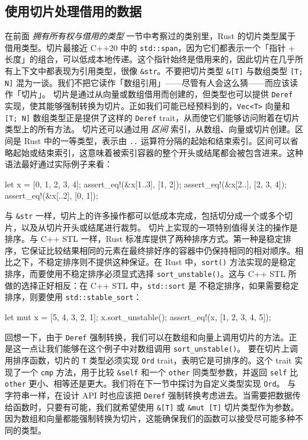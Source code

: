 \subsection{使用切片处理借用的数据}
\label{idx:idx_71c78df5}
在前面 \emph{拥有所有权与借用的类型} 一节中考察过的类别里，Rust 的切片类型属于借用类型。切片最接近 C++20 中的 \texttt{std::span}，因为它们都表示一个「指针 + 长度」的组合，可以低成本地传递。这个指针始终是借用来的，因此切片在几乎所有上下文中都表现为引用类型，很像 \texttt{\&str}。不要把切片类型 \texttt{\&[T]} 与数组类型 \texttt{[T; N]} 混为一谈。我们不把它读作「数组引用」——尽管有人会这么猜——而应该读作「切片」。
切片是通过从向量或数组借用而创建的，但类型也可以提供 \texttt{Deref} 实现，使其能够强制转换为切片。正如我们可能已经预料到的，\texttt{Vec<T>} 向量和 \texttt{[T; N]} 数组类型正是提供了这样的 \texttt{Deref} trait，从而使它们能够访问附着在切片类型上的所有方法。
切片还可以通过用 \emph{区间} 索引，从数组、向量或切片创建。区间是 Rust 中的一等类型，表示由 \texttt{..} 运算符分隔的起始和结束索引。区间可以省略起始或结束索引，这意味着被索引容器的整个开头或结尾都会被包含进来。这种语法最好通过实际例子来看：
\begin{codebox}[rust]
let x = [0, 1, 2, 3, 4];
assert_eq!(&x[1..3], [1, 2]);
assert_eq!(&x[2..], [2, 3, 4]);
assert_eq!(&x[..2], [0, 1]);
\end{codebox}
与 \texttt{\&str} 一样，切片上的许多操作都可以低成本完成，包括切分成一个或多个切片，以及从切片开头或结尾进行裁剪。
切片上实现的一项特别值得关注的操作是排序。与 C++ STL 一样，Rust 标准库提供了两种排序方式。第一种是稳定排序，它保证比较结果相同的元素在最终排好序的容器中仍保持相同的相对顺序。相比之下，不稳定排序则不提供这种保证。在 Rust 中，\texttt{sort()} 方法实现的是稳定排序，而要使用不稳定排序必须显式选择
\texttt{sort\_\allowbreak{}unstable(\allowbreak{})\allowbreak{}}。这与 C++ STL 所做的选择正好相反：在 C++ STL 中，\texttt{std::sort} 是
不稳定排序，如果需要稳定排序，则要使用 \texttt{std::\allowbreak{}stable\_\allowbreak{}sort}：
\begin{codebox}[rust]
let mut x = [5, 4, 3, 2, 1];
x.sort_unstable();
assert_eq!(x, [1, 2, 3, 4, 5]);
\end{codebox}
回想一下，由于 \texttt{Deref} 强制转换，我们可以在数组和向量上调用切片的方法。正是这一点让我们能够在这个例子中对数组调用 \texttt{sort\_\allowbreak{}unstable(\allowbreak{})\allowbreak{}}。
\label{idx:idx_97a8e17a}
要在切片上调用排序函数，切片的 \texttt{T} 类型必须实现 \texttt{Ord} trait，表明它是可排序的。这个 trait 实现了一个 \texttt{cmp} 方法，用于比较 \texttt{\&self} 和一个
\texttt{other} 同类型参数，并返回 \texttt{self} 比
\texttt{other} 更小、相等还是更大。我们将在下一节中探讨为自定义类型实现 \texttt{Ord}。
与字符串一样，在设计 API 时也应该把 \texttt{Deref} 强制转换考虑进去。当需要把数据传给函数时，只要有可能，我们就希望使用 \texttt{\&[T]} 或 \texttt{\&mut [T]} 切片类型作为参数。因为数组和向量都能强制转换为切片，这能确保我们的函数可以接受尽可能多种不同的类型。

